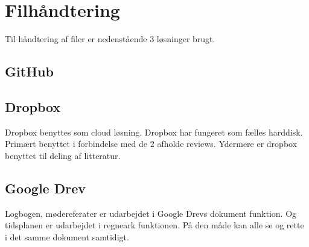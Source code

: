 \section{Filhåndtering}
Til håndtering af filer er nedenstående 3 løsninger brugt. 

\subsection{GitHub}



\subsection{Dropbox}

Dropbox benyttes som cloud løsning. Dropbox har fungeret som fælles harddisk. Primært benyttet i forbindelse med de 2 afholde reviews. Ydermere er dropbox benyttet til deling af litteratur. 

\subsection{Google Drev}

Logbogen, mødereferater er udarbejdet i Google Drevs dokument funktion. Og tidsplanen er udarbejdet i regneark funktionen. På den måde kan alle se og rette i det samme dokument samtidigt. 


